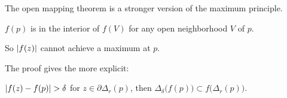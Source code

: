 \documentclass[10pt,aspectratio=169]{beamer}
\begin{document}
\begin{frame}
The open mapping theorem is a stronger version of the maximum
principle.

\medskip
\pause

$f(p)$ is in the interior of $f(V)$ for any open neighborhood $V$ of $p$.

\pause
So $\lvert {f(z)} \rvert$ cannot achieve a maximum at $p$.

\medskip
\pause

The proof gives the more explicit:

\medskip

$\left\lvert {f(z)-f(p)} \right\rvert > \delta$ for $z \in \partial \Delta_r(p)$,
then
$\Delta_{\delta}\bigl(f(p)\bigr) \subset f\bigl(\Delta_r(p)\bigr)$.
\end{frame}
\end{document}
